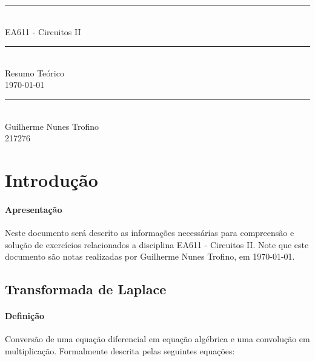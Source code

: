 \documentclass{article}
\newcommand{\nameSubject}{EA611 - Circuitos II}
\newcommand{\nameAuthor}{Guilherme Nunes Trofino}
\begin{document}
    \begin{titlepage}
        \begin{center}
            \rule{450pt}{0.5pt}\\[4mm]
            {\Huge \nameSubject}\\
            \rule{450pt}{0.5pt}\\[2mm]
            {\Large Resumo Teórico}\\[200mm]
            \today\\
            \rule{250pt}{0.5pt}\\
            {\large \nameAuthor}\\
            {\large 217276}\\
        \end{center}
    \end{titlepage}
\newpage

    \tableofcontents
\newpage


    \section{Introdução}
        \paragraph{Apresentação}Neste documento será descrito as informações necessárias para compreensão e solução de exercícios relacionados a disciplina \nameSubject. Note que este documento são notas realizadas por \nameAuthor, em \today.

        \subsection{Transformada de Laplace}
            \paragraph{Definição}Conversão de uma equação diferencial em equação algébrica e uma convolução em multiplicação. Formalmente descrita pelas seguintes equações:
\end{document}
